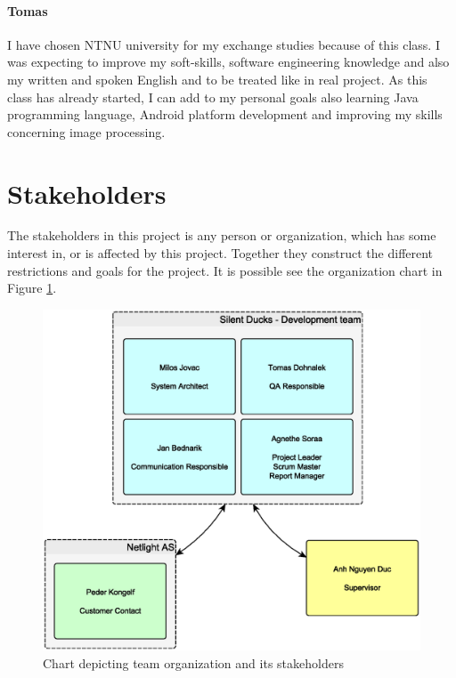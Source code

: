 \paragraph{Tomas}
I have chosen NTNU university for my exchange studies because of this class. 
I was expecting to improve my soft-skills, software engineering knowledge and also my written and spoken English and to be treated like in real project.
As this class has already started, I can add to my personal goals also learning Java programming language,
Android platform development and improving my skills concerning image processing.

\section{Stakeholders} \label{txt:introduction_stakeholders}

The stakeholders in this project is any person or organization, which has some interest in, or is affected by this project. Together they construct the different restrictions and goals for the project. 
It is possible see the organization chart in Figure \ref{img:organization_chart}.

\begin{figure}[!ht]
    \begin{center}
    \includegraphics[width=12cm]{images/organization_chart.eps}
    \caption[Oganization chart]{Chart depicting team organization and its stakeholders}
    \label{img:organization_chart}
    \end{center}
\end{figure}

